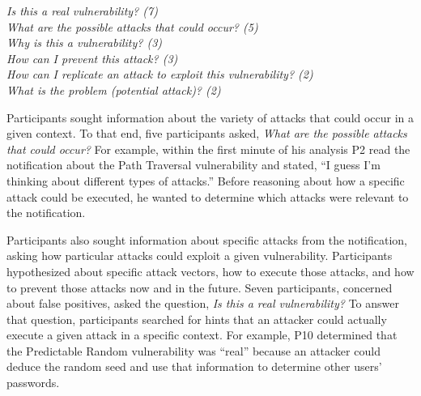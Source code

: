 \documentclass{acm_proc_article-sp}
\begin{document}
\noindent\emph{Is this a real vulnerability? (7)} \\
\emph{What are the possible attacks that could occur? (5)} \\
\emph{Why is this a vulnerability? (3)} \\
\emph{How can I prevent this attack? (3)} \\
\emph{How can I replicate an attack to exploit this vulnerability? (2)} \\
\emph{What is the problem (potential attack)? (2)} 


Participants sought information about the variety of attacks that could occur in a given context.
To that end, five participants asked, \textit{What are the possible attacks that could occur?}
For example, within the first minute of his analysis P2 read the notification about the Path Traversal vulnerability and stated, ``I guess I'm thinking about different types of attacks.''
Before reasoning about how a specific attack could be executed, he wanted to determine which attacks were relevant to the notification.

Participants also sought information about specific attacks from the notification, asking how particular attacks could exploit a given vulnerability.
Participants hypothesized about specific attack vectors, how to execute those attacks, and how to prevent those attacks now and in the future.
Seven participants, concerned about false positives, asked the question, \textit{Is this a real vulnerability?} 
To answer that question, participants searched for hints that an attacker could actually execute a given attack in a specific context. 
For example, P10 determined that the Predictable Random vulnerability was ``real'' because an attacker could deduce the random seed and use that information to determine other users' passwords. 


\end{document}
